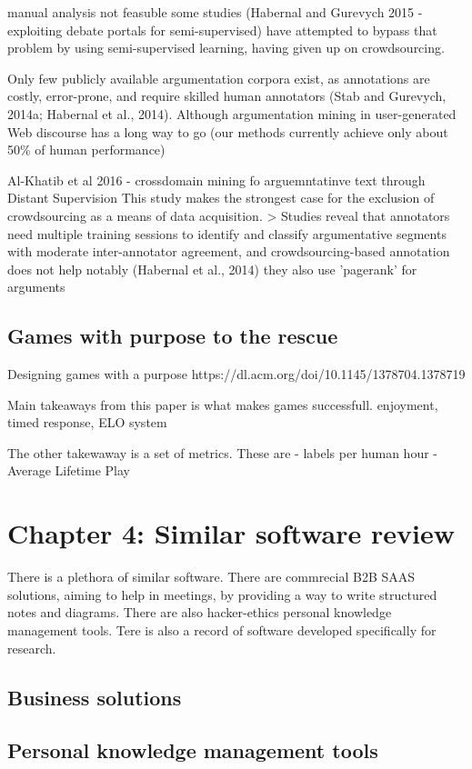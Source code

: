 \documentclass{article}
\begin{document}
manual analysis not feasuble some studies (Habernal and Gurevych 2015 - exploiting debate portals for semi-supervised) have attempted to bypass that problem by using semi-supervised learning, having given up on crowdsourcing.

Only few publicly available argumentation corpora exist, as annotations are costly, error-prone, and require skilled human annotators (Stab and Gurevych, 2014a; Habernal et al., 2014).
Although argumentation mining in user-generated Web discourse has a long way to go (our methods currently achieve only about 50\% of human performance)

Al-Khatib et al 2016 - crossdomain mining fo arguemntatinve text through Distant Supervision
This study makes the strongest case for the exclusion of crowdsourcing as a means of data acquisition.
> Studies reveal that annotators need multiple training sessions to identify and classify argumentative segments with moderate inter-annotator agreement, and crowdsourcing-based annotation does not help notably (Habernal et al., 2014)
they also use 'pagerank' for arguments

\subsection{Games with purpose to the rescue}
Designing games with a purpose
https://dl.acm.org/doi/10.1145/1378704.1378719

Main takeaways from this paper is what makes games successfull.
enjoyment, timed response, ELO system

The other takewaway is a set of metrics. These are
- labels per human hour
- Average Lifetime Play

\section{Chapter 4: Similar software review}

There is a plethora of similar software. 
There are commrecial B2B SAAS solutions, aiming to help in meetings, by providing a way to write structured notes and diagrams.
There are also hacker-ethics personal knowledge management tools.
Tere is also a record of software developed specifically for research.

\subsection{Business solutions}

\subsection{Personal knowledge management tools}
\end{document}
